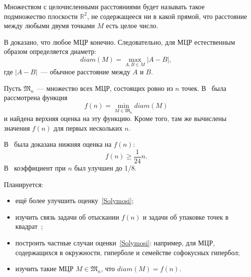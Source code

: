 \documentclass[a4paper,12pt]{article}
\theoremstyle{VMMSHtheorem}
\theoremstyle{VMMSHremark}
\begin{document}
{
}

\vspace{2cm}

Множеством с целочисленными расстояниями будет называть такое подмножество плоскости $\mathbb{R}^2$,
не содержащееся ни в какой прямой,
что расстояние между любыми двумя точками $M$ есть целое число.

В \cite{anning1945integral,erdos1945integral} доказано, что любое МЦР конечно.
Следовательно, для МЦР естественным образом определяется диаметр:
$$
	diam(M) = \max_{A,B\in M} |A-B|,
$$
где $|A-B|$~--- обычное расстояние между $A$ и $B$.

Пусть $\mathfrak{M}_n$~--- множество всех МЦР, состоящих ровно из $n$ точек.
В~\cite{harborth1993upper} была рассмотрена функция
$$
	f(n) = \min_{M\in\mathfrak{M}_n} diam(M)
$$
и найдена верхняя оценка на эту функцию.
Кроме того, там же вычислены значения $f(n)$ для первых нескольких $n$.

В~\cite{solymosi2003note} была доказана нижняя оценка на $f(n)$:
\begin{equation}\label{Solymosi}
f(n) \geqslant \frac{1}{24} n
.
\end{equation}
В~\cite{our-mz-rus} коэффициент при $n$ был улучшен до 1/8.

Планируется:
\begin{itemize}
\item
ещё более улучшить оценку~\eqref{Solymosi};
\item
изучить связь задачи об отыскании $f(n)$ и задачи об упаковке точек в квадрат~\cite{locatelli2002packing};
\item
построить частные случаи оценки~\eqref{Solymosi}:
например, для МЦР, содержащихся в окружности, гиперболе и семействе софокусных гипербол;
\item
изучить такие МЦР $M\in\mathfrak{M}_n$, что $diam(M)=f(n)$.
\end{itemize}




\printbibliography
\end{document}
